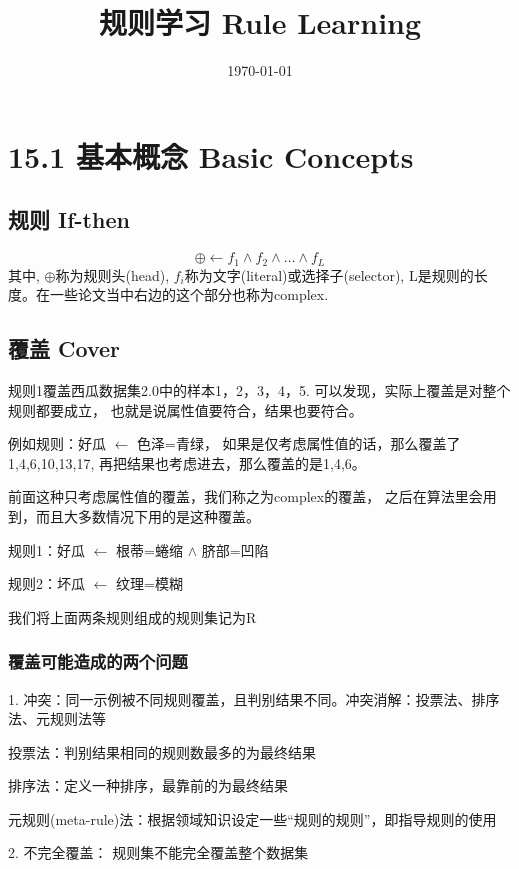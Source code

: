 \documentclass[UTF8]{article}
\title{规则学习 Rule Learning}
\author{}
\date{\today}
\begin{document}
\maketitle
\section{15.1 基本概念 Basic Concepts}
\subsection{规则 If-then}
    \begin{equation}
        \oplus \leftarrow f_1 \wedge f_2 \wedge \dots \wedge f_L
    \end{equation}
    其中, $\oplus$称为规则头(head), $f_i$称为文字(literal)或选择子(selector),
    L是规则的长度。在一些论文当中右边的这个部分也称为complex.

\subsection{覆盖 Cover}
    规则1覆盖西瓜数据集2.0中的样本1，2，3，4，5.
    可以发现，实际上覆盖是对整个规则都要成立，
    也就是说属性值要符合，结果也要符合。

    例如规则：好瓜 $\leftarrow$ 色泽=青绿，
    如果是仅考虑属性值的话，那么覆盖了1,4,6,10,13,17,
    再把结果也考虑进去，那么覆盖的是1,4,6。

    前面这种只考虑属性值的覆盖，我们称之为complex的覆盖，
    之后在算法里会用到，而且大多数情况下用的是这种覆盖。
    
    规则1：好瓜 $\leftarrow$ 根蒂=蜷缩 $\wedge$ 脐部=凹陷
    
    规则2：坏瓜 $\leftarrow$ 纹理=模糊

    我们将上面两条规则组成的规则集记为R

\subsubsection{覆盖可能造成的两个问题}
    1. 冲突：同一示例被不同规则覆盖，且判别结果不同。冲突消解：投票法、排序法、元规则法等  
        
    投票法：判别结果相同的规则数最多的为最终结果

    排序法：定义一种排序，最靠前的为最终结果

    元规则(meta-rule)法：根据领域知识设定一些“规则的规则”，即指导规则的使用
        
    2. 不完全覆盖： 规则集不能完全覆盖整个数据集
\end{document}
